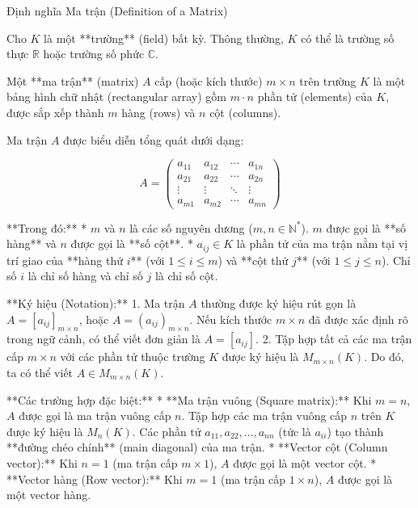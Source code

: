 Định nghĩa Ma trận (Definition of a Matrix)

Cho $K$ là một **trường** (field) bất kỳ. Thông thường, $K$ có thể là trường số thực $\mathbb{R}$ hoặc trường số phức $\mathbb{C}$.

Một **ma trận** (matrix) $A$ cấp (hoặc kích thước) $m \times n$ trên trường $K$ là một bảng hình chữ nhật (rectangular array) gồm $m \cdot n$ phần tử (elements) của $K$, được sắp xếp thành $m$ hàng (rows) và $n$ cột (columns).

Ma trận $A$ được biểu diễn tổng quát dưới dạng:

$$
A =
\begin{pmatrix}
a_{11} & a_{12} & \cdots & a_{1n} \\
a_{21} & a_{22} & \cdots & a_{2n} \\
\vdots & \vdots & \ddots & \vdots \\
a_{m1} & a_{m2} & \cdots & a_{mn}
\end{pmatrix}
$$

**Trong đó:**
* $m$ và $n$ là các số nguyên dương ($m, n \in \mathbb{N}^*$). $m$ được gọi là **số hàng** và $n$ được gọi là **số cột**.
* $a_{ij} \in K$ là phần tử của ma trận nằm tại vị trí giao của **hàng thứ $i$** (với $1 \le i \le m$) và **cột thứ $j$** (với $1 \le j \le n$). Chỉ số $i$ là chỉ số hàng và chỉ số $j$ là chỉ số cột.

**Ký hiệu (Notation):**
1.  Ma trận $A$ thường được ký hiệu rút gọn là $A = [a_{ij}]_{m \times n}$, hoặc $A = (a_{ij})_{m \times n}$. Nếu kích thước $m \times n$ đã được xác định rõ trong ngữ cảnh, có thể viết đơn giản là $A = [a_{ij}]$.
2.  Tập hợp tất cả các ma trận cấp $m \times n$ với các phần tử thuộc trường $K$ được ký hiệu là $M_{m \times n}(K)$. Do đó, ta có thể viết $A \in M_{m \times n}(K)$.

**Các trường hợp đặc biệt:**
* **Ma trận vuông (Square matrix):** Khi $m = n$, $A$ được gọi là ma trận vuông cấp $n$. Tập hợp các ma trận vuông cấp $n$ trên $K$ được ký hiệu là $M_n(K)$. Các phần tử $a_{11}, a_{22}, \dots, a_{nn}$ (tức là $a_{ii}$) tạo thành **đường chéo chính** (main diagonal) của ma trận.
* **Vector cột (Column vector):** Khi $n = 1$ (ma trận cấp $m \times 1$), $A$ được gọi là một vector cột.
* **Vector hàng (Row vector):** Khi $m = 1$ (ma trận cấp $1 \times n$), $A$ được gọi là một vector hàng.
